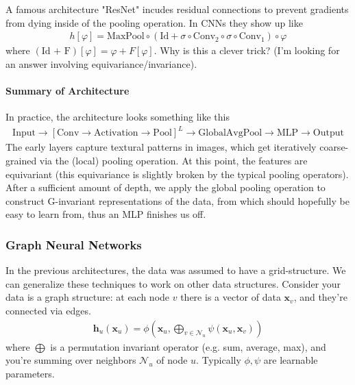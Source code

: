 \begin{problem}
	A famous architecture "ResNet" incudes residual connections to prevent gradients from dying inside of the pooling operation. In CNNs they show up like
	\begin{align}
		h[\varphi] = \text{MaxPool} \circ (\text{Id} + \sigma \circ \text{Conv}_2 \circ \sigma \circ \text{Conv}_1) \circ \varphi
	\end{align}
	where $(\text{Id + F})[\varphi] = \varphi + F[\varphi]$. Why is this a clever trick? (I'm looking for an answer involving equivariance/invariance). 
\end{problem}



\paragraph{Summary of Architecture}
In practice, the architecture looks something like this
\begin{align*}
	\text{Input} \to [\text{Conv} \to \text{Activation} \to \text{Pool}] ^ L \to \text{GlobalAvgPool} \to \text{MLP} \to \text{Output}
\end{align*}
The early layers capture textural patterns in images, which get iteratively coarse-grained via the (local) pooling operation. At this point, the features are equivariant (this equivariance is slightly broken by the typical pooling operators). After a sufficient amount of depth, we apply the global pooling operation to construct G-invariant representations of the data, from which should hopefully be easy to learn from, thus an MLP finishes us off.

\subsubsection{Graph Neural Networks}
In the previous architectures, the data was assumed to have a grid-structure. We can generalize these techniques to work on other data structures. Consider your data is a graph structure: at each node $v$ there is a vector of data $\mathbf x_v$, and they're connected via edges.
\begin{align}
	\mathbf h_u(\mathbf x_u) =  \phi \left( \mathbf x_u,  \bigoplus_{v \in \mathcal N_u} \psi(\mathbf x_u, \mathbf x_v)\right)
\end{align}
where $\bigoplus$ is a permutation invariant operator (e.g. sum, average, max), and you're summing over neighbors $\mathcal N_u$ of node $u$. Typically $\phi,\psi$ are learnable parameters.

